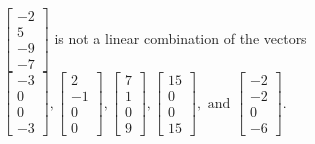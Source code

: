 \begin{exercise}
\begin{exerciseStatement}
  \end{exerciseStatement}
  \begin{exerciseAnswer}
   \(\left[\begin{array}{c}
-2 \\
5 \\
-9 \\
-7
\end{array}\right]\) 
  	 is not  
	a linear combination of the vectors \(\left[\begin{array}{c}
-3 \\
0 \\
0 \\
-3
\end{array}\right] , \left[\begin{array}{c}
2 \\
-1 \\
0 \\
0
\end{array}\right] , \left[\begin{array}{c}
7 \\
1 \\
0 \\
9
\end{array}\right] , \left[\begin{array}{c}
15 \\
0 \\
0 \\
15
\end{array}\right] , \text{ and } \left[\begin{array}{c}
-2 \\
-2 \\
0 \\
-6
\end{array}\right]\).

	
  


  \end{exerciseAnswer}
\end{exercise}